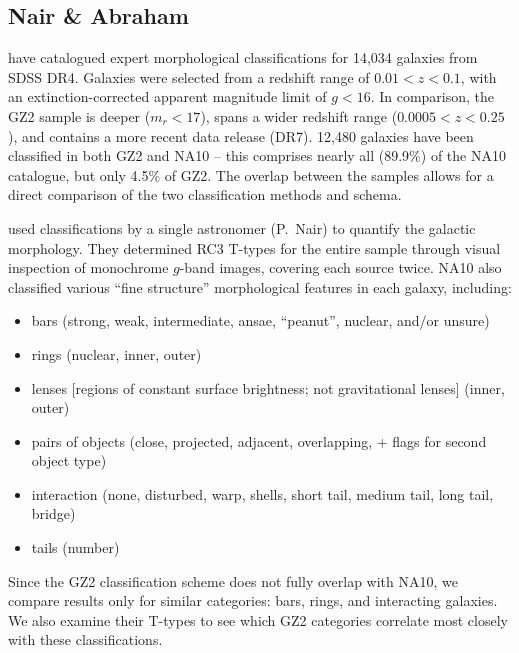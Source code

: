 \documentclass[useAMS,usenatbib]{mn2e}
\begin{document}
\subsection{Nair \& Abraham}

\citet[][hereafter NA10]{nai10} have catalogued expert morphological classifications for 14,034 galaxies from SDSS DR4. Galaxies were selected from a redshift range of $0.01<z<0.1$, with an extinction-corrected apparent magnitude limit of $g<16$. In comparison, the GZ2 sample is deeper ($m_r<17$), spans a wider redshift range ($0.0005<z<0.25$), and contains a more recent data release (DR7). 12,480 galaxies have been classified in both GZ2 and NA10 -- this comprises nearly all (89.9\%) of the NA10 catalogue, but only 4.5\% of GZ2. The overlap between the samples allows for a direct comparison of the two classification methods and schema.  

\citet{nai10} used classifications by a single astronomer (P.~Nair) to quantify the galactic morphology. They determined RC3 T-types \citep[a numerical index of a galaxy's stage along the Hubble sequence;][]{dev91} for the entire sample through visual inspection of monochrome $g$-band images, covering each source twice. NA10 also classified various ``fine structure'' morphological features in each galaxy, including:

\begin{itemize}
	\item bars (strong, weak, intermediate, ansae, ``peanut'', nuclear, and/or unsure)
	\item rings (nuclear, inner, outer)
	\item lenses [regions of constant surface brightness; not gravitational lenses] (inner, outer)
	\item pairs of objects (close, projected, adjacent, overlapping, + flags for second object type)
	\item interaction (none, disturbed, warp, shells, short tail, medium tail, long tail, bridge)
	\item tails (number)
\end{itemize}


\noindent Since the GZ2 classification scheme does not fully overlap with NA10, we compare results only for similar categories: bars, rings, and interacting galaxies. We also examine their T-types to see which GZ2 categories correlate most closely with these classifications. 
\end{document}
